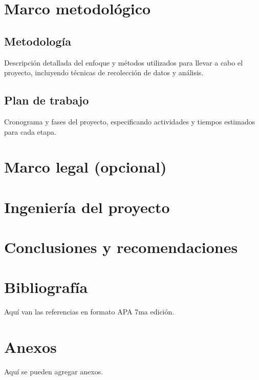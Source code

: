 \documentclass[12pt,letterpaper]{report}
\begin{document}
	\newpage
	\section{Marco metodológico}
	
	\subsection{Metodología}
	Descripción detallada del enfoque y métodos utilizados para llevar a cabo el proyecto, incluyendo técnicas de recolección de datos y análisis.
	
	\subsection{Plan de trabajo}
	Cronograma y fases del proyecto, especificando actividades y tiempos estimados para cada etapa.
	\newpage
	\section{Marco legal (opcional)}
	
	\newpage
	\section{Ingeniería del proyecto}
	
	\newpage
	\section{Conclusiones y recomendaciones}
	
	\newpage
	\section*{Bibliografía}
	Aquí van las referencias en formato APA 7ma edición.
	
	\newpage
	\section*{Anexos}
	Aquí se pueden agregar anexos.
	
\end{document}
